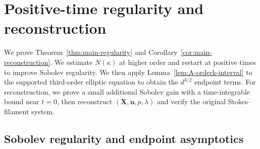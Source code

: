 \documentclass[11pt,reqno]{amsart}
\theoremstyle{plain}
\theoremstyle{definition}
\numberwithin{equation}{section}
\newcommand{\bm}[1]{\boldsymbol{#1}}
\begin{document}
\section{Positive-time regularity and reconstruction}
\label{sec:regularity-theory}

We prove Theorem~\ref{thm:main-regularity} and
Corollary~\ref{cor:main-reconstruction}. We estimate $N(\kappa)$ at higher order
and restart at positive times to improve Sobolev regularity. We then apply
Lemma~\ref{lem:A-orderk-interval} to the supported third-order elliptic equation
to obtain the $d^{3/2}$ endpoint terms. For reconstruction, we prove a small
additional Sobolev gain with a time-integrable bound near $t=0$, then
reconstruct $(\bm X,\bm u,p,\lambda)$ and verify the original Stokes--filament system.

\subsection{Sobolev regularity and endpoint asymptotics}

\label{subsec:regularity-proof}
\end{document}
